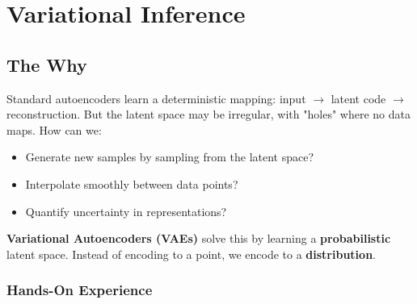 
\chapter{Variational Inference}


\section{The Why}


Standard autoencoders learn a deterministic mapping: input $\to$ latent code $\to$ reconstruction. But the latent space may be irregular, with "holes" where no data maps. How can we:
\begin{itemize}
    \item Generate new samples by sampling from the latent space?
    \item Interpolate smoothly between data points?
    \item Quantify uncertainty in representations?
\end{itemize}

\textbf{Variational Autoencoders (VAEs)} solve this by learning a \textbf{probabilistic} latent space. Instead of encoding to a point, we encode to a \textbf{distribution}.

\subsection{Hands-On Experience}

\begin{marginfigure}
\caption{VAE latent space: each input encodes to a distribution (red ellipses), regularized toward the prior (blue circles).}
\end{marginfigure}

